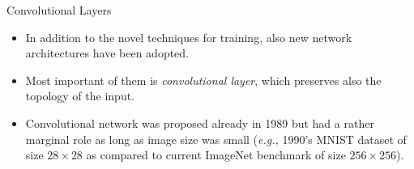 \documentclass[10pt, aspectratio=169]{beamer} %
\begin{document}
\begin{frame}[fragile,allowframebreaks=0.8]{Convolutional Layers}

	\begin{itemize}
		\item In addition to the novel techniques for training, also new network architectures 
		have been adopted.
		\item Most important of them is \emph{convolutional layer}, which preserves also the topology
		of the input.
		\item Convolutional network was proposed already in 1989 but had a rather marginal role
		as long as image size was small (\emph{e.g.,} 1990's MNIST dataset of size $28\times 28$ as compared
		to current ImageNet benchmark of size $256\times 256$).
		\end{itemize}
\end{frame}
\end{document}
